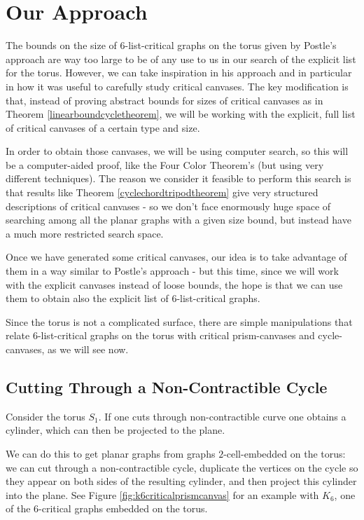\section{Our Approach}

The bounds on the size of $6$-list-critical graphs on the torus given by Postle's approach are 
way too large to be of any use to us in our search of the explicit list for the torus. However, 
we can take inspiration in his approach and in particular in how it was useful to carefully study
critical canvases. The key modification is that, instead of proving abstract bounds for sizes
of critical canvases as in Theorem \ref{linearboundcycletheorem}, we will be working with the 
explicit, full list of critical canvases of a certain type and size. 

In order to obtain those canvases, we will be using computer search, so this will be a 
computer-aided proof, like the Four Color Theorem's (but using very different techniques). The 
reason we consider it feasible to perform this search is that results like 
Theorem \ref{cyclechordtripodtheorem} give very structured descriptions of 
critical canvases - so we don't face enormously huge space of searching among
all the planar graphs with a given size bound, but instead have a much more restricted
search space. 

Once we have generated some critical canvases, our idea is to take advantage of them in a way 
similar to Postle's approach - but this time, 
since we will work with the explicit canvases instead of loose bounds, the hope is that we
can use them to obtain also the explicit list of $6$-list-critical graphs. 

Since the torus is not a complicated surface, there are simple manipulations 
that relate $6$-list-critical graphs on the torus with critical prism-canvases
 and cycle-canvases, as we will see now. 

\subsection{Cutting Through a Non-Contractible Cycle}

Consider the torus $S_1$. If one cuts through non-contractible curve
one obtains a cylinder,
which can then be projected to the plane. 

We can do this to get planar graphs from graphs $2$-cell-embedded on the torus: we can cut 
through a non-contractible cycle, duplicate the vertices on the cycle so they appear on both
sides of the resulting cylinder, and then project this cylinder into the plane. See Figure \ref{fig:k6criticalprismcanvas} for an example with $K_6$, one of the $6$-critical graphs
embedded on the torus. 

